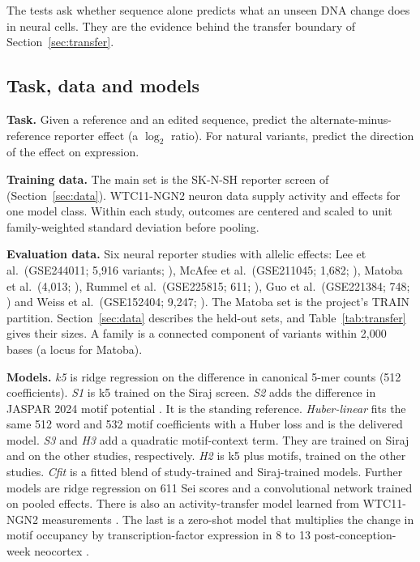 \documentclass[10.5pt,a4paper]{article}
\begin{document}
The tests ask whether sequence alone predicts what an unseen DNA change does in neural cells. They are the evidence behind the transfer boundary of Section~\ref{sec:transfer}.

\subsection{Task, data and models}

\textbf{Task.} Given a reference and an edited sequence, predict the alternate-minus-reference reporter effect (a $\log_2$ ratio). For natural variants, predict the direction of the effect on expression.

\textbf{Training data.} The main set is the SK-N-SH reporter screen of \citet{siraj2026} (Section~\ref{sec:data}). WTC11-NGN2 neuron data \citep{salomon2026} supply activity and effects for one model class. Within each study, outcomes are centered and scaled to unit family-weighted standard deviation before pooling.

\textbf{Evaluation data.} Six neural reporter studies with allelic effects: Lee et al.\ (GSE244011; 5,916 variants; \citealt{lee2025}), McAfee et al.\ (GSE211045; 1,682; \citealt{mcafee2023}), Matoba et al.\ (4,013; \citealt{matoba2026}), Rummel et al.\ (GSE225815; 611; \citealt{rummel2023}), Guo et al.\ (GSE221384; 748; \citealt{guo2023}) and Weiss et al.\ (GSE152404; 9,247; \citealt{weiss2021}). The Matoba set is the project's TRAIN partition. Section~\ref{sec:data} describes the held-out sets, and Table~\ref{tab:transfer} gives their sizes. A family is a connected component of variants within 2,000 bases (a locus for Matoba).

\textbf{Models.} \emph{k5} is ridge regression on the difference in canonical 5-mer counts (512 coefficients). \emph{S1} is k5 trained on the Siraj screen. \emph{S2} adds the difference in JASPAR 2024 motif potential \citep{rauluseviciute2024}. It is the standing reference. \emph{Huber-linear} fits the same 512 word and 532 motif coefficients with a Huber loss and is the delivered model. \emph{S3} and \emph{H3} add a quadratic motif-context term. They are trained on Siraj and on the other studies, respectively. \emph{H2} is k5 plus motifs, trained on the other studies. \emph{Cfit} is a fitted blend of study-trained and Siraj-trained models. Further models are ridge regression on 611 Sei scores \citep{chen2022} and a convolutional network trained on pooled effects. There is also an activity-transfer model learned from WTC11-NGN2 measurements \citep[motivated by][]{seitz2024,tareen2022}. The last is a zero-shot model that multiplies the change in motif occupancy by transcription-factor expression in 8 to 13 post-conception-week neocortex \citep{kang2011,miller2014}.
\end{document}
